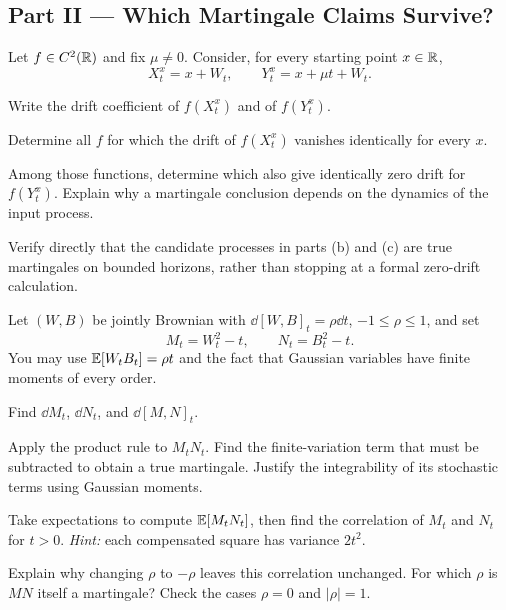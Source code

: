 \clearpage
\subsection*{Part II --- Which Martingale Claims Survive?}

\begin{exercise}
Let \(f\in C^2(\mathbb{R})\) and fix \(\mu\neq0\). Consider, for every starting
point \(x\in\mathbb{R}\),
\[
X_t^x=x+W_t,
\qquad
Y_t^x=x+\mu t+W_t.
\]
\begin{exparts}
  \item Write the drift coefficient of \(f(X_t^x)\) and of
  \(f(Y_t^x)\).
  \item Determine all \(f\) for which the drift of \(f(X_t^x)\)
  vanishes identically for every \(x\).
  \item Among those functions, determine which also give identically
  zero drift for \(f(Y_t^x)\). Explain why a martingale conclusion
  depends on the dynamics of the input process.
  \item Verify directly that the candidate processes in parts (b) and
  (c) are true martingales on bounded horizons, rather than stopping at
  a formal zero-drift calculation.
\end{exparts}
\end{exercise}

\begin{exercise}
Let \((W,B)\) be jointly Brownian with
\(\dd[W,B]_t=\rho\dd t\), \(-1\leq\rho\leq1\), and set
\[
M_t=W_t^2-t,
\qquad
N_t=B_t^2-t.
\]
You may use \(\mathbb{E}[W_tB_t]=\rho t\) and the fact that Gaussian variables
have finite moments of every order.
\begin{exparts}
  \item Find \(\dd M_t\), \(\dd N_t\), and \(\dd[M,N]_t\).
  \item Apply the product rule to \(M_tN_t\). Find the finite-variation
  term that must be subtracted to obtain a true martingale. Justify the
  integrability of its stochastic terms using Gaussian moments.
  \item Take expectations to compute \(\mathbb{E}[M_tN_t]\), then find the
  correlation of \(M_t\) and \(N_t\) for \(t>0\).
  \emph{Hint:} each compensated square has variance \(2t^2\).
  \item Explain why changing \(\rho\) to \(-\rho\) leaves this
  correlation unchanged. For which \(\rho\) is \(MN\) itself a
  martingale? Check the cases \(\rho=0\) and \(|\rho|=1\).
\end{exparts}
\end{exercise}

